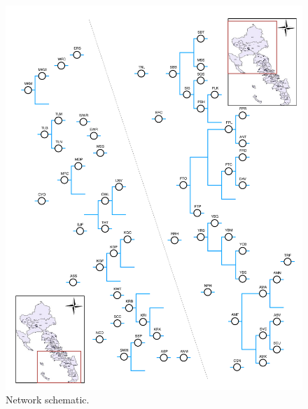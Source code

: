 \begin{figure}
	\centering
	\includegraphics[width=\textwidth,trim={1.5cm 1.5cm 1.5cm 1.5cm},clip=true]{plots/cdecnetwork.pdf}
	\caption{Network schematic.} 
	\label{fig:newtorkmap}
\end{figure}

